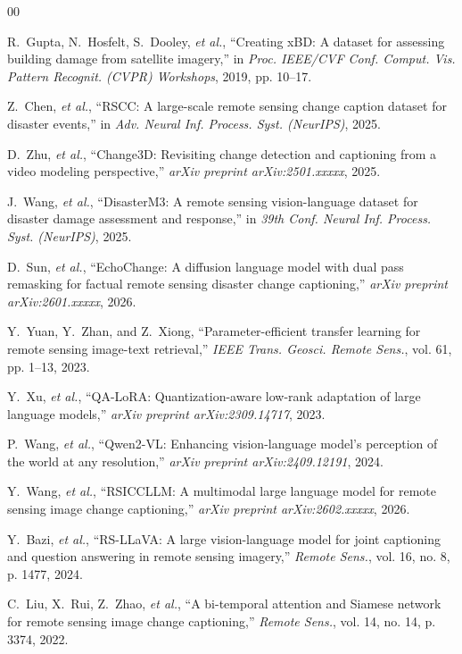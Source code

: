 \documentclass[conference]{IEEEtran}
\begin{document}
\begin{thebibliography}{00}

R.~Gupta, N.~Hosfelt, S.~Dooley, \textit{et al.}, ``Creating xBD: A dataset for assessing building damage from satellite imagery,'' in \textit{Proc. IEEE/CVF Conf. Comput. Vis. Pattern Recognit. (CVPR) Workshops}, 2019, pp. 10--17.

Z.~Chen, \textit{et al.}, ``RSCC: A large-scale remote sensing change caption dataset for disaster events,'' in \textit{Adv. Neural Inf. Process. Syst. (NeurIPS)}, 2025.

D.~Zhu, \textit{et al.}, ``Change3D: Revisiting change detection and captioning from a video modeling perspective,'' \textit{arXiv preprint arXiv:2501.xxxxx}, 2025.

J.~Wang, \textit{et al.}, ``DisasterM3: A remote sensing vision-language dataset for disaster damage assessment and response,'' in \textit{39th Conf. Neural Inf. Process. Syst. (NeurIPS)}, 2025.

D.~Sun, \textit{et al.}, ``EchoChange: A diffusion language model with dual pass remasking for factual remote sensing disaster change captioning,'' \textit{arXiv preprint arXiv:2601.xxxxx}, 2026.

Y.~Yuan, Y.~Zhan, and Z.~Xiong, ``Parameter-efficient transfer learning for remote sensing image-text retrieval,'' \textit{IEEE Trans. Geosci. Remote Sens.}, vol. 61, pp. 1--13, 2023.

Y.~Xu, \textit{et al.}, ``QA-LoRA: Quantization-aware low-rank adaptation of large language models,'' \textit{arXiv preprint arXiv:2309.14717}, 2023.

P.~Wang, \textit{et al.}, ``Qwen2-VL: Enhancing vision-language model's perception of the world at any resolution,'' \textit{arXiv preprint arXiv:2409.12191}, 2024.

Y.~Wang, \textit{et al.}, ``RSICCLLM: A multimodal large language model for remote sensing image change captioning,'' \textit{arXiv preprint arXiv:2602.xxxxx}, 2026.

Y.~Bazi, \textit{et al.}, ``RS-LLaVA: A large vision-language model for joint captioning and question answering in remote sensing imagery,'' \textit{Remote Sens.}, vol. 16, no. 8, p. 1477, 2024.

C.~Liu, X.~Rui, Z.~Zhao, \textit{et al.}, ``A bi-temporal attention and Siamese network for remote sensing image change captioning,'' \textit{Remote Sens.}, vol. 14, no. 14, p. 3374, 2022.


\end{thebibliography}
\end{document}
